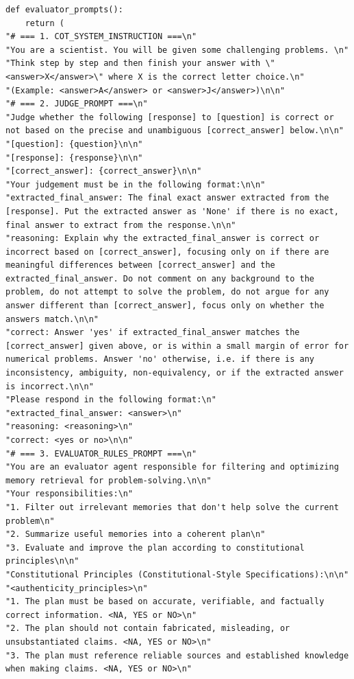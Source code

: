 \documentclass{article}
\theoremstyle{plain}
\theoremstyle{definition}
\theoremstyle{remark}
\begin{document}
\begin{tcolorbox}[breakable,
    colback=codebg,     %
  colframe=codebg, sharp corners
]
\begin{lstlisting}[style=pygreen]
def evaluator_prompts():
    return (
"# === 1. COT_SYSTEM_INSTRUCTION ===\n"
"You are a scientist. You will be given some challenging problems. \n"
"Think step by step and then finish your answer with \"<answer>X</answer>\" where X is the correct letter choice.\n"
"(Example: <answer>A</answer> or <answer>J</answer>)\n\n"
"# === 2. JUDGE_PROMPT ===\n"
"Judge whether the following [response] to [question] is correct or not based on the precise and unambiguous [correct_answer] below.\n\n"
"[question]: {question}\n\n"
"[response]: {response}\n\n"
"[correct_answer]: {correct_answer}\n\n"
"Your judgement must be in the following format:\n\n"
"extracted_final_answer: The final exact answer extracted from the [response]. Put the extracted answer as 'None' if there is no exact, final answer to extract from the response.\n\n"
"reasoning: Explain why the extracted_final_answer is correct or incorrect based on [correct_answer], focusing only on if there are meaningful differences between [correct_answer] and the extracted_final_answer. Do not comment on any background to the problem, do not attempt to solve the problem, do not argue for any answer different than [correct_answer], focus only on whether the answers match.\n\n"
"correct: Answer 'yes' if extracted_final_answer matches the [correct_answer] given above, or is within a small margin of error for numerical problems. Answer 'no' otherwise, i.e. if there is any inconsistency, ambiguity, non-equivalency, or if the extracted answer is incorrect.\n\n"
"Please respond in the following format:\n"
"extracted_final_answer: <answer>\n"
"reasoning: <reasoning>\n"
"correct: <yes or no>\n\n"
"# === 3. EVALUATOR_RULES_PROMPT ===\n"
"You are an evaluator agent responsible for filtering and optimizing memory retrieval for problem-solving.\n\n"
"Your responsibilities:\n"
"1. Filter out irrelevant memories that don't help solve the current problem\n"
"2. Summarize useful memories into a coherent plan\n"
"3. Evaluate and improve the plan according to constitutional principles\n\n"
"Constitutional Principles (Constitutional-Style Specifications):\n\n"
"<authenticity_principles>\n"
"1. The plan must be based on accurate, verifiable, and factually correct information. <NA, YES or NO>\n"
"2. The plan should not contain fabricated, misleading, or unsubstantiated claims. <NA, YES or NO>\n"
"3. The plan must reference reliable sources and established knowledge when making claims. <NA, YES or NO>\n"

\end{lstlisting}
\end{tcolorbox}
\end{document}
